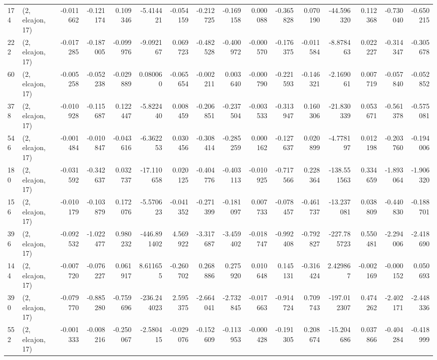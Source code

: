 \begin{tabular}{llrrrrrrrrrrrrrr}
174 &  (2, elcajon, 17) &  -0.011662 & -0.121174 &  0.109346 &   -5.414421 & -0.054159 &  -0.212725 &  -0.169158 &  0.000088 & -0.365828 &  0.070190 &  -44.596320 &  0.112368 &  -0.730040 &  -0.650215 \\
222 &  (2, elcajon, 17) &  -0.017285 & -0.187005 & -0.099976 &   -9.092167 &  0.069723 &  -0.482528 &  -0.400972 & -0.000570 & -0.176375 & -0.011584 &   -8.878463 &  0.022227 &  -0.314347 &  -0.305678 \\
60  &  (2, elcajon, 17) &  -0.005258 & -0.052238 & -0.029889 &    0.080060 & -0.065654 &  -0.002211 &   0.003640 & -0.000790 & -0.221593 & -0.146321 &   -2.169061 &  0.007719 &  -0.057840 &  -0.052852 \\
378 &  (2, elcajon, 17) &  -0.010928 & -0.115687 &  0.122447 &   -5.822440 &  0.008459 &  -0.206851 &  -0.237504 & -0.003533 & -0.313947 &  0.160306 &  -21.830339 &  0.053671 &  -0.561378 &  -0.575081 \\
546 &  (2, elcajon, 17) &  -0.001484 & -0.010847 & -0.043616 &   -6.362253 &  0.030456 &  -0.308414 &  -0.285259 &  0.000162 & -0.127637 &  0.020899 &   -4.778197 &  0.012198 &  -0.203760 &  -0.194006 \\
180 &  (2, elcajon, 17) &  -0.031592 & -0.342637 &  0.032737 &  -17.110658 &  0.020125 &  -0.404776 &  -0.403113 & -0.010925 & -0.717566 &  0.228364 & -138.551563 &  0.334659 &  -1.893064 &  -1.906320 \\
156 &  (2, elcajon, 17) &  -0.010179 & -0.103879 &  0.172076 &   -5.570623 & -0.041352 &  -0.271399 &  -0.181097 &  0.007733 & -0.078457 & -0.461737 &  -13.237081 &  0.038809 &  -0.440830 &  -0.188701 \\
396 &  (2, elcajon, 17) &  -0.092532 & -1.022477 &  0.980232 & -446.891402 &  4.569922 &  -3.317687 &  -3.459402 & -0.018747 & -0.992408 & -0.792827 & -227.785723 &  0.550481 &  -2.294006 &  -2.418690 \\
144 &  (2, elcajon, 17) &  -0.007720 & -0.076227 &  0.061917 &    8.611655 & -0.260702 &   0.268886 &   0.275920 &  0.010648 &  0.145131 & -0.316424 &    2.429867 & -0.002169 &  -0.000152 &   0.050693 \\
390 &  (2, elcajon, 17) &  -0.079770 & -0.885280 & -0.759696 & -236.244023 &  2.595375 &  -2.664041 &  -2.732845 & -0.017663 & -0.914724 &  0.709743 & -197.012307 &  0.474262 &  -2.402171 &  -2.448336 \\
552 &  (2, elcajon, 17) &  -0.001333 & -0.008216 & -0.250067 &   -2.580415 & -0.029076 &  -0.152609 &  -0.113953 & -0.000428 & -0.191305 &  0.208674 &  -15.204686 &  0.037866 &  -0.404284 &  -0.418999 \\

\end{tabular}
